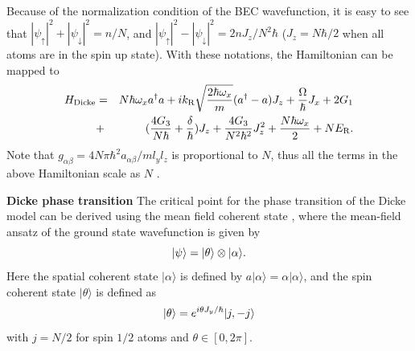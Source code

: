 \documentclass[prl,aps,twocolumn,floatfix]{revtex4}
\begin{document}
Because of the normalization condition of the BEC wavefunction, it is easy
to see that $|\psi _{\uparrow }|^{2}+|\psi _{\downarrow }|^{2}=n/N$, and $%
|\psi _{\uparrow }|^{2}-|\psi _{\downarrow }|^{2}=2nJ_z/N^2\hbar $ ($%
J_{z}=N\hbar /2$ when all atoms are in the spin up state). With these
notations, the Hamiltonian can be mapped to
\begin{eqnarray}
H_{\text{Dicke}} &=&N\hbar \omega _{x}a^{\dagger }{a}+ik_{\text{R}}\sqrt{%
\frac{2\hbar \omega _{x}}{m}}(a^{\dagger }-a)J_{z}+\frac{\Omega }{\hbar }%
J_{x}+2G_{1}  \notag \\
&+&(\frac{4G_{3}}{N\hbar }+\frac{\delta }{\hbar })J_{z}+\frac{4G_{3}}{%
N^{2}\hbar ^{2}}J_{z}^{2}+\frac{N\hbar \omega _{x}}{2}+NE_{\text{R}}.
\end{eqnarray}
Note that $g_{\alpha\beta}=4N\pi\hbar^2 a_{\alpha\beta}/ml_{y}l_{z}$ is
proportional to $N$, thus all the terms in the above Hamiltonian scale as $N$%
.

\textbf{Dicke phase transition} The critical point for the phase transition
of the Dicke model can be derived using the mean field coherent state \cite%
{Bakemeier}, where the mean-field ansatz of the ground state wavefunction is
given by
\begin{equation}
|\psi \rangle =|\theta \rangle \otimes |\alpha \rangle .  \notag
\end{equation}%
Here the spatial coherent state $|\alpha \rangle $ is defined by $a|\alpha
\rangle =\alpha |\alpha \rangle $, and the spin coherent state $|\theta
\rangle$ is defined as
\begin{equation}
|\theta \rangle =e^{i\theta {J_{y}/}\hbar }|j,-j\rangle  \notag
\end{equation}%
with $j=N/2$ for spin $1/2$ atoms and $\theta \in {[0,2\pi ]}$.
\end{document}
